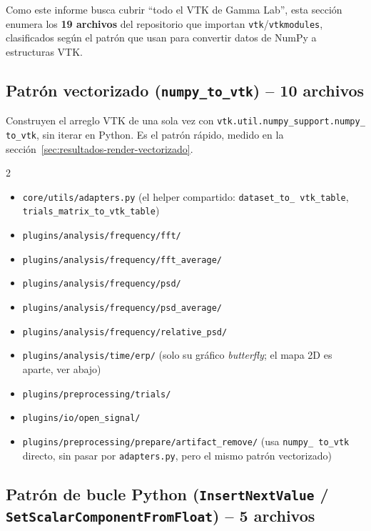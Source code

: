 \documentclass[11pt,a4paper]{article}
\begin{document}
Como este informe busca cubrir ``todo el VTK de Gamma Lab'', esta sección enumera los \textbf{19 archivos}
del repositorio que importan \texttt{vtk}/\texttt{vtkmodules}, clasificados según el patrón que usan para
convertir datos de NumPy a estructuras VTK.

\subsection{Patrón vectorizado (\texttt{numpy\_\allowbreak to\_\allowbreak vtk}) -- 10 archivos}

Construyen el arreglo VTK de una sola vez con \texttt{vtk.util.numpy\_\allowbreak support.numpy\_\allowbreak
to\_\allowbreak vtk}, sin iterar en Python. Es el patrón rápido, medido en la
sección~\ref{sec:resultados-render-vectorizado}.

\begin{multicols}{2}
\begin{itemize}[nosep]
  \item \texttt{core/utils/adapters.py} (el helper compartido: \texttt{dataset\_\allowbreak to\_\allowbreak
        vtk\_\allowbreak table}, \texttt{trials\_\allowbreak matrix\_\allowbreak to\_\allowbreak vtk\_\allowbreak table})
  \item \texttt{plugins/analysis/frequency/fft/}
  \item \texttt{plugins/analysis/frequency/fft\_\allowbreak average/}
  \item \texttt{plugins/analysis/frequency/psd/}
  \item \texttt{plugins/analysis/frequency/psd\_\allowbreak average/}
  \item \texttt{plugins/analysis/frequency/relative\_\allowbreak psd/}
  \item \texttt{plugins/analysis/time/erp/} (solo su gráfico \textit{butterfly}; el mapa 2D es aparte, ver abajo)
  \item \texttt{plugins/preprocessing/trials/}
  \item \texttt{plugins/io/open\_\allowbreak signal/}
  \item \texttt{plugins/preprocessing/prepare/artifact\_\allowbreak remove/} (usa \texttt{numpy\_\allowbreak
        to\_\allowbreak vtk} directo, sin pasar por \texttt{adapters.py}, pero el mismo patrón vectorizado)
\end{itemize}
\end{multicols}

\subsection{Patrón de bucle Python (\texttt{InsertNextValue} / \texttt{SetScalarComponentFromFloat}) -- 5 archivos}
\end{document}
